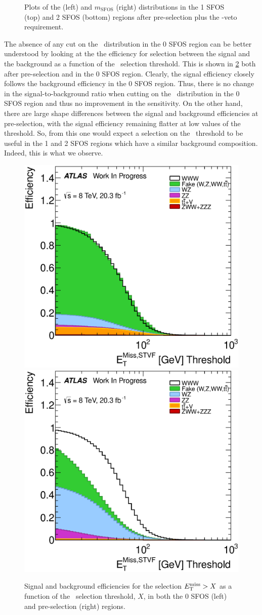 \begin{figure}[ht!]
\caption{Plots of the \MET (left) and $m_{\textrm{SFOS}}$ (right) distributions 
in the 1 SFOS (top) and 2 SFOS (bottom) regions after pre-selection
plus the \bee-veto requirement.}
\label{fig:met_zwindow_optimization}
\end{figure}

The absence of any cut on the \MET~distribution in the 0 SFOS
region can be better understood by looking at the 
the efficiency for selection between 
the signal and the background as a function of the \MET~selection threshold.
This is shown in \fig\ref{fig:met_eff} both after pre-selection
and in the 0 SFOS region.
Clearly, the signal efficiency closely follows the background efficiency
in the 0 SFOS region. Thus, there is no change in the
signal-to-background ratio when cutting on the \MET~distribution
in the 0 SFOS region and thus no improvement in the sensitivity.
On the other hand, there are large shape differences 
between the signal
and background efficiencies at pre-selection, with the 
signal efficiency remaining flatter at low values of the \MET~
threshold. So, from this one would expect a selection
on the \MET~threshold to be useful in the 1 and 2 SFOS
regions which have a similar background composition. 
Indeed, this is what we observe.


\begin{figure}[ht!]
\centering
\includegraphics[width=0.45\columnwidth]{figures/optimization/SignalRegionsPreselection_0SFOS_Efficiencies/MET_Et_STVF_Cumulative.eps}
\includegraphics[width=0.45\columnwidth]{figures/optimization/SignalRegions_0p5mmZ0_Preselection_Efficiencies/MET_Et_STVF_Cumulative.eps}
\caption{ Signal and background efficiencies for the 
selection $E_{\mathrm{T}}^{\mathrm{miss}} > X$ as a function of the \MET~selection
threshold, $X$,  in both the 0 SFOS (left) and pre-selection (right) regions.  }
\label{fig:met_eff}
\end{figure}

